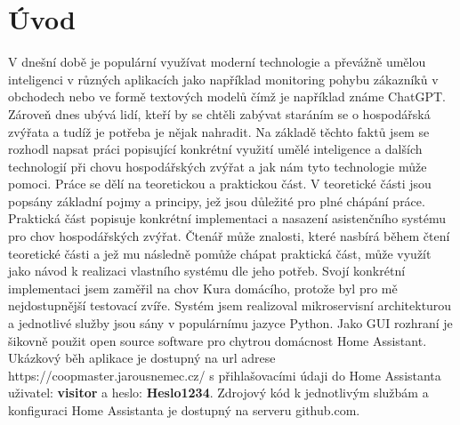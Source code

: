 \chapter{Úvod}
V dnešní době je populární využívat moderní technologie a převážně umělou inteligenci v různých aplikacích jako například monitoring pohybu zákazníků v obchodech nebo ve formě textových modelů čímž je například známe ChatGPT. Zároveň dnes ubývá lidí, kteří by se chtěli zabývat staráním se o hospodářská zvýřata a tudíž je potřeba je nějak nahradit. Na základě těchto faktů jsem se rozhodl napsat práci popisující konkrétní využití umělé inteligence a dalších technologií při chovu hospodářských zvýřat a jak nám tyto technologie může pomoci.
\newline
Práce se dělí na teoretickou a praktickou část. V teoretické části jsou popsány základní pojmy a principy, jež jsou důležité pro plné chápání práce. Praktická část popisuje konkrétní implementaci a nasazení asistenčního systému pro chov hospodářských zvýřat. Čtenář může znalosti, které nasbírá během čtení teoretické části a jež mu následně pomůže chápat praktická část, může využít jako návod k realizaci vlastního systému dle jeho potřeb.
\newline
Svojí konkrétní implementaci jsem zaměřil na chov Kura domácího, protože byl pro mě nejdostupnější testovací zvíře. Systém jsem realizoval mikroservisní architekturou a jednotlivé služby jsou sány v populárnímu jazyce Python. Jako GUI rozhraní je šikovně použit open source software pro chytrou domácnost Home Assistant.
\newline
Ukázkový běh aplikace je dostupný na url adrese https://coopmaster.jarousnemec.cz/ s přihlašovacími údaji do Home Assistanta uživatel: \textbf{visitor} a heslo: \textbf{Heslo1234}. Zdrojový kód k jednotlivým službám a konfiguraci Home Assistanta je dostupný na serveru github.com.

\newpage